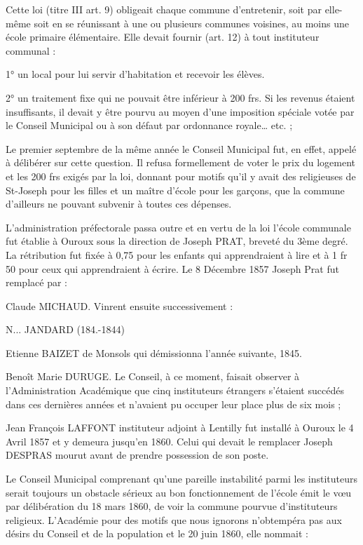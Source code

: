 Cette loi (titre III art. 9) obligeait chaque commune d'entretenir, soit par elle-même soit en se réunissant à une ou plusieurs communes voisines, au moins une école primaire élémentaire. Elle devait fournir (art. 12) à tout instituteur communal :

1° un local pour lui servir d'habitation et recevoir les élèves.

2° un traitement fixe qui ne pouvait être inférieur à 200 frs. Si les revenus étaient insuffisants, il devait y être pourvu au moyen d'une imposition spéciale votée par le Conseil Municipal ou à son défaut par ordonnance royale… etc. ;

Le premier septembre de la même année le Conseil Municipal fut, en effet, appelé à délibérer sur cette question. Il refusa formellement de voter le prix du logement et les 200 frs exigés par la loi, donnant pour motifs qu'il y avait des religieuses de St-Joseph pour les filles et un maître d'école pour les garçons, que la commune
d'ailleurs ne pouvant subvenir à toutes ces dépenses.

L'administration préfectorale passa outre et en vertu de la loi l'école communale fut établie à Ouroux sous la direction de Joseph PRAT, breveté du 3ème degré. La rétribution fut fixée à 0,75 pour les enfants qui apprendraient à lire et à 1 fr 50 pour ceux qui apprendraient à écrire. Le 8 Décembre 1857 Joseph Prat fut remplacé par :

Claude MICHAUD. Vinrent ensuite successivement :

N... JANDARD (184.-1844)

Etienne BAIZET de Monsols qui démissionna l'année suivante, 1845.

Benoît Marie DURUGE. Le Conseil, à ce moment, faisait observer à l'Administration Académique que cinq instituteurs étrangers s'étaient succédés dans ces dernières années et n'avaient pu occuper leur place plus de six mois ;

Jean François LAFFONT instituteur adjoint à Lentilly fut installé à Ouroux le 4 Avril 1857 et y demeura jusqu'en 1860. Celui qui devait le remplacer Joseph DESPRAS mourut avant de prendre possession de son poste.

Le Conseil Municipal comprenant qu'une pareille instabilité parmi les instituteurs serait toujours un obstacle sérieux au bon fonctionnement de l'école émit le vœu par délibération du 18 mars 1860, de voir la commune pourvue d'instituteurs religieux. L'Académie pour des motifs que nous ignorons n'obtempéra pas aux désirs du Conseil et de la population et le 20 juin 1860, elle nommait :


